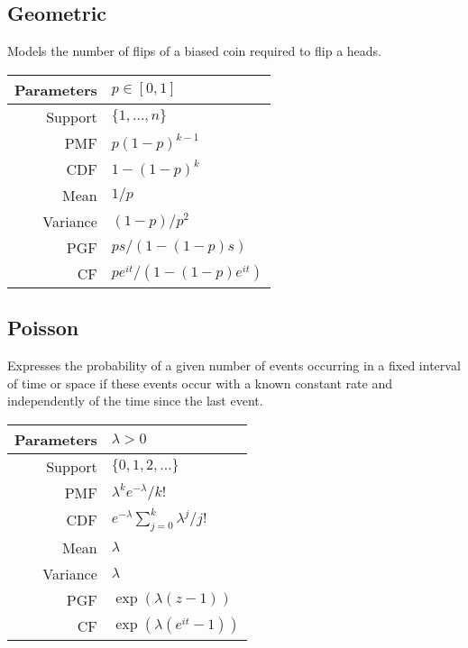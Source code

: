 \documentclass[12pt]{article}
\begin{document}
\subsection{Geometric}
Models the number of flips of a biased coin required to flip a heads.
\begin{center}
\def\arraystretch{1.5}
\begin{tabular}{|r|l|} \hline
    Parameters & \( p\in[0,1] \) \\ \hline
    Support & \( \{1,\ldots, n\} \) \\ \hline
    PMF & \( p(1-p)^{k-1} \) \\ \hline 
    CDF & \( 1-(1-p)^k \) \\ \hline
    Mean & \( 1/p \) \\ \hline
    Variance & \( (1-p)/p^2 \) \\ \hline
    PGF & \( ps/(1-(1-p)s) \) \\ \hline
    CF & \( pe^{it}/(1-(1-p)e^{it}) \)\\ \hline
\end{tabular}
\end{center}

\subsection{Poisson}
Expresses the probability of a given number of events occurring in a fixed interval of time or space if these events occur with a known constant rate and independently of the time since the last event.
\begin{center}
\def\arraystretch{1.5}
\begin{tabular}{|r|l|} \hline
    Parameters & \( \lambda > 0 \) \\ \hline
    Support & \( \{0,1,2,\ldots\} \) \\ \hline
    PMF & \( \lambda^k e^{-\lambda}/k! \) \\ \hline 
    CDF & \( e^{-\lambda} \sum_{j=0}^{k} \lambda^j/j! \) \\ \hline
    Mean & \( \lambda \) \\ \hline
    Variance & \( \lambda \) \\ \hline
    PGF & \( \exp(\lambda(z-1)) \) \\ \hline
    CF & \( \exp(\lambda(e^{it}-1)) \)\\ \hline
\end{tabular}
\end{center}
\end{document}
